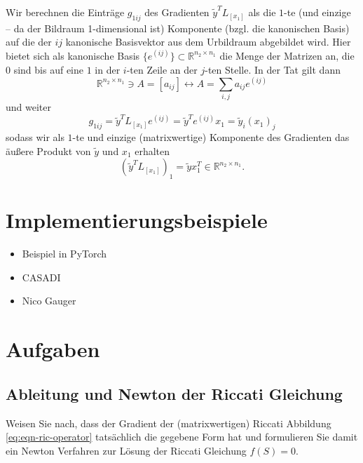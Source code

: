 \documentclass[
]{book}
\providecommand{\tightlist}{%
  \setlength{\itemsep}{0pt}\setlength{\parskip}{0pt}}
\theoremstyle{definition}
\theoremstyle{definition}
\theoremstyle{definition}
\theoremstyle{definition}
\theoremstyle{remark}
\begin{document}
Wir berechnen die Einträge \(g_{1ij}\) des Gradienten \(\tilde y^T L_{[x_1]}\)
als die \(1\)-te (und einzige -- da der Bildraum 1-dimensional ist) Komponente
(bzgl. die kanonischen Basis) auf die der \(ij\) kanonische Basisvektor aus dem
Urbildraum abgebildet wird. Hier bietet sich als kanonische Basis
\(\{e^{(ij)}\}\subset \mathbb R^{n_2\times n_1}\)
die Menge der Matrizen an, die \(0\) sind bis auf eine \(1\) in der \(i\)-ten Zeile an der
\(j\)-ten Stelle. In der Tat gilt dann
\begin{equation*}
\mathbb R^{n_2\times n_1}\ni A = [a_{ij}] \leftrightarrow A =
\sum_{i,j}a_{ij}e^{(ij)}
\end{equation*}
und weiter
\begin{equation*}
g_{1ij}=\tilde y^TL_{[x_1]}e^{(ij)} = \tilde y^T e^{(ij)}x_1 = \tilde y_i (x_{1})_j
\end{equation*}
sodass wir als \(1\)-te und einzige (matrixwertige) Komponente des Gradienten das
äußere Produkt von \(\tilde y\) und \(x_1\) erhalten
\begin{equation*}
(\tilde y^T L_{[x_1]})_1 = \tilde y x_1^T \in \mathbb R^{n_2 \times n_1}.
\end{equation*}

\hypertarget{implementierungsbeispiele}{%
\section{Implementierungsbeispiele}\label{implementierungsbeispiele}}

\begin{itemize}
\tightlist
\item
  Beispiel in PyTorch
\item
  CASADI
\item
  Nico Gauger
\end{itemize}

\hypertarget{aufgaben-3}{%
\section{Aufgaben}\label{aufgaben-3}}

\hypertarget{ableitung-und-newton-der-riccati-gleichung}{%
\subsection{Ableitung und Newton der Riccati Gleichung}\label{ableitung-und-newton-der-riccati-gleichung}}

Weisen Sie nach, dass der Gradient der (matrixwertigen) Riccati Abbildung
\eqref{eq:eqn-ric-operator}
tatsächlich die gegebene Form hat und formulieren Sie damit ein Newton
Verfahren zur Lösung der Riccati Gleichung \(f(S)=0\).
\end{document}
